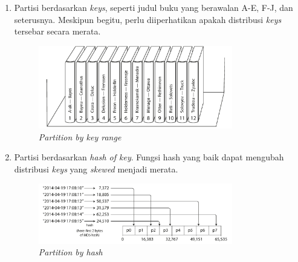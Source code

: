 \begin{enumerate}
    \item Partisi berdasarkan \textit{keys}, seperti judul buku yang berawalan A-E, F-J, dan seterusnya. Meskipun begitu, perlu diiperhatikan apakah distribusi \textit{keys} tersebar secara merata.
          \begin{figure}
              \centering
              \includegraphics[width=0.8\textwidth]{resources/chapter-2/partition-by-key-range.png}
              \caption{\textit{Partition by key range \parencite{dataIntensiveApplications}}}
              \label{fig: partition-by-key-range}
          \end{figure}

    \item Partisi berdasarkan \textit{hash of key}. Fungsi hash yang baik dapat mengubah distribusi \textit{keys} yang \textit{skewed} menjadi merata.
          \begin{figure}
              \centering
              \includegraphics[width=0.8\textwidth]{resources/chapter-2/partition-by-hash.png}
              \caption{\textit{Partition by hash \parencite{dataIntensiveApplications}}}
              \label{fig:partition-by-hash}
          \end{figure}

\end{enumerate}
